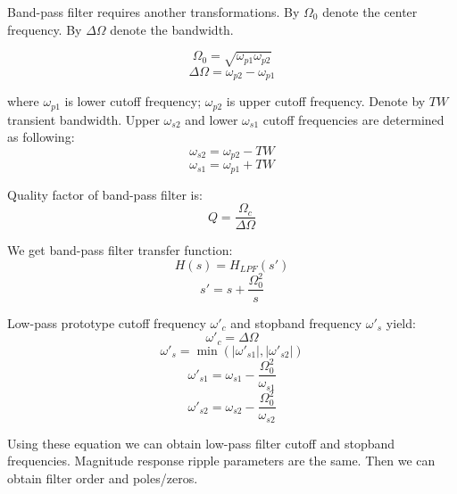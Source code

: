 Band-pass filter requires another transformations. 
By $\Omega_0$ denote the center frequency. By $\Delta\Omega$ denote the
bandwidth.

\begin{equation}
 \Omega_0 = \sqrt{\omega_{p1}\omega_{p2}}
\end{equation}
\begin{equation}
 \Delta\Omega = \omega_{p2} - \omega_{p1}
\end{equation}

where $\omega_{p1}$ is lower cutoff frequency; $\omega_{p2}$ is upper cutoff
frequency. Denote by $TW$ transient bandwidth. Upper $\omega_{s2}$ and lower
$\omega_{s1}$ cutoff frequencies are determined as following:
\begin{equation}
 \omega_{s2}=\omega_{p2}-TW
\end{equation}
\begin{equation}
 \omega_{s1}=\omega_{p1}+TW
\end{equation}

Quality factor of band-pass filter is: 
\begin{equation}
 Q=\frac{\Omega_c}{\Delta\Omega}
\end{equation}


We get band-pass filter transfer function:
\begin{equation}
 H(s)=H_{LPF}(s')
\end{equation}
\begin{equation}
 s'=s+\frac{\Omega_0^2}{s}
\end{equation}



Low-pass prototype cutoff frequency $\omega'_c$ and stopband frequency
$\omega'_s$ yield:
\begin{equation}
 \omega'_c = \Delta\Omega
\end{equation}
\begin{equation}
 \omega'_s= \min(|\omega'_{s1}|,|\omega'_{s2}|)
\end{equation}
\begin{equation}
 \omega'_{s1}=\omega_{s1}-\frac{\Omega_0^2}{\omega_{s1}}
\end{equation}
\begin{equation}
 \omega'_{s2}=\omega_{s2}-\frac{\Omega_0^2}{\omega_{s2}}
\end{equation}

Using these equation we can obtain low-pass filter cutoff and stopband
frequencies. Magnitude response ripple parameters are the same. Then we can
obtain filter order and poles/zeros.

